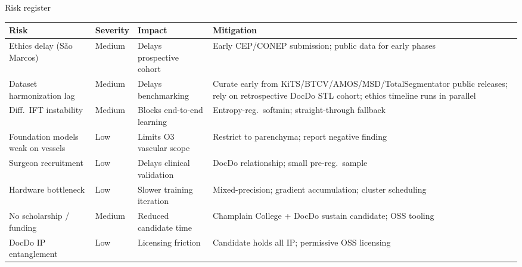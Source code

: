 \documentclass[aspectratio=169,11pt,xcolor=table]{beamer}
\begin{document}
\begin{frame}{Risk register}
\tiny
\begin{center}
\begin{tabular}{p{2.8cm}p{1.5cm}p{2.0cm}p{4.0cm}}
\toprule
\textbf{Risk} & \textbf{Severity} & \textbf{Impact} & \textbf{Mitigation} \\
\midrule
\rowcolor{sevmed} Ethics delay (São Marcos) & Medium & Delays prospective cohort & Early CEP/CONEP submission; public data for early phases \\
\rowcolor{sevmed} Dataset harmonization lag & Medium & Delays benchmarking & Curate early from KiTS/BTCV/AMOS/MSD/TotalSegmentator public releases; rely on retrospective DocDo STL cohort; ethics timeline runs in parallel \\
\rowcolor{sevmed} Diff.\ IFT instability & Medium & Blocks end-to-end learning & Entropy-reg.\ softmin; straight-through fallback \\
\rowcolor{sevlow} Foundation models weak on vessels & Low & Limits O3 vascular scope & Restrict to parenchyma; report negative finding \\
\rowcolor{sevlow} Surgeon recruitment & Low & Delays clinical validation & DocDo relationship; small pre-reg.\ sample \\
\rowcolor{sevlow} Hardware bottleneck & Low & Slower training iteration & Mixed-precision; gradient accumulation; cluster scheduling \\
\rowcolor{sevmed} No scholarship / funding & Medium & Reduced candidate time & Champlain College + DocDo sustain candidate; OSS tooling \\
\rowcolor{sevlow} DocDo IP entanglement & Low & Licensing friction & Candidate holds all IP; permissive OSS licensing \\
\bottomrule
\end{tabular}
\end{center}
\end{frame}
\end{document}
